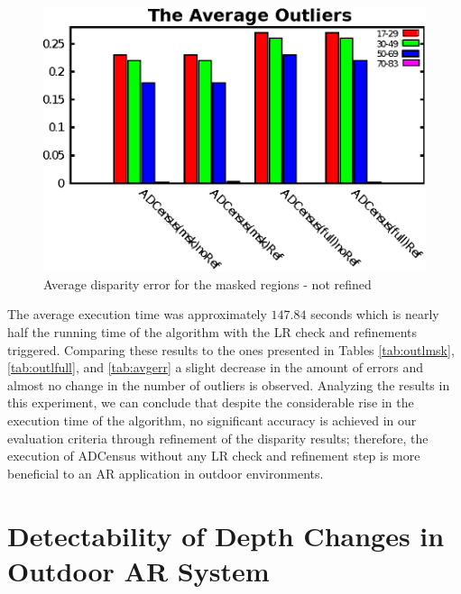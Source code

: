 \begin{figure}[H]
\centering
\includegraphics[scale=0.9]{adcrefNoref}
\caption{Average disparity error for the masked regions - not refined}
\label{fig:outlnoref}
\end{figure} 

The average execution time was approximately $147.84$ seconds which is nearly half the running time of the algorithm with the LR check and refinements triggered. 
Comparing these results to the ones presented in Tables \ref{tab:outlmsk}, \ref{tab:outlfull}, and \ref{tab:avgerr} a slight decrease in the amount of errors and 
almost no change in the number of outliers is observed.
Analyzing the results in this experiment, we can conclude that despite the considerable rise in the execution time of the algorithm, no significant
accuracy is achieved in our evaluation criteria through refinement of the disparity results; therefore, the execution of ADCensus without any LR check and
refinement step is more beneficial to an AR application in outdoor environments.

\section{Detectability of Depth Changes in Outdoor AR System}

